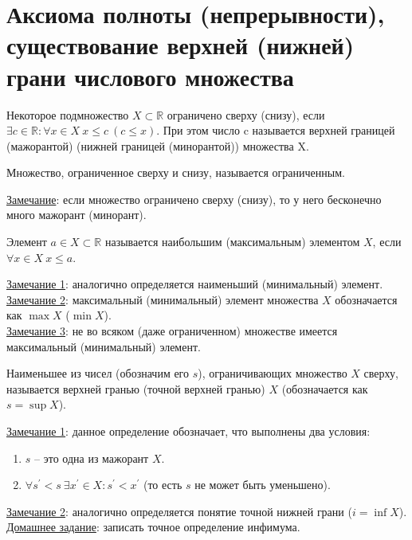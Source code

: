 \documentclass{article}
\begin{document}
    \section{Аксиома полноты (непрерывности), существование верхней (нижней) грани числового множества}
    \begin{definition}
        Некоторое подмножество \(X \subset \mathbb{R}\) ограничено сверху (снизу),
        если \(\exists c \in \mathbb{R}: \forall x \in X\ x \leq c\ (c \leq x)\). При этом число c называется верхней границей (мажорантой) (нижней границей (минорантой)) множества X.
    \end{definition}
    \begin{definition}
        Множество, ограниченное сверху и снизу, называется ограниченным.
    \end{definition}
    \noindent
    \underline{Замечание}: если множество ограничено сверху (снизу), то у него бесконечно много мажорант (минорант).
    \begin{definition}
        Элемент \(a \in X \subset \mathbb{R}\) называется наибольшим (максимальным) элементом \(X\), если
        \(\forall x \in X\ x \leq a\). 
    \end{definition}
    \noindent
    \underline{Замечание 1}: аналогично определяется наименьший (минимальный) элемент.\\
    \underline{Замечание 2}: максимальный (минимальный) элемент множества \(X\) обозначается как \(\max{X}\) (\(\min{X}\)).\\
    \underline{Замечание 3}: не во всяком (даже ограниченном) множестве имеется максимальный (минимальный) элемент. 
    \begin{definition}
        Наименьшее из чисел (обозначим его \(s\)), ограничивающих множество \(X\) сверху, называется верхней гранью (точной верхней гранью) \(X\) (обозначается как \(s = \sup{X}\)).  
    \end{definition}
    \noindent
    \underline{Замечание 1}: данное определение обозначает, что выполнены два условия:
    \begin{enumerate}
        \item \(s\) -- это одна из мажорант \(X\).
        \item \(\forall s^{\prime} < s\ \exists x^{\prime} \in X: s^{\prime} < x^{\prime} \) (то есть \(s\) не может быть уменьшено).
    \end{enumerate}
    \underline{Замечание 2}: аналогично определяется понятие точной нижней грани (\(i = \inf{X}\)).\\
    \underline{Домашнее задание}: записать точное определение инфимума.
\end{document}
